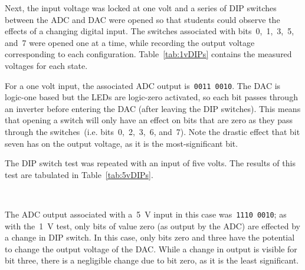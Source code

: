 Next, the input voltage was locked at one volt and a series of DIP switches between the ADC and DAC were opened so that students could observe the effects of a changing digital input.  The switches associated with bits~0,~1,~3,~5, and~7 were opened one at a time, while recording the output voltage corresponding to each configuration.  Table~\ref{tab:1vDIPs} contains the measured voltages for each state.
%
\begin{table}[H]
	\centering
	
	\parbox{.6\textwidth}{
	\caption[\SI{1}{\volt}DC DIP Switches]{Measured output for various DIP switch configurations with a~\SI{1}{\volt} input.}
	\label{tab:1vDIPs}}
\end{table}
%
For a one volt input, the associated ADC output is~\texttt{0011 0010}.  The DAC is logic-one based but the LEDs are logic-zero activated, so each bit passes through an inverter before entering the DAC (after leaving the DIP switches).  This means that opening a switch will only have an effect on bits that are zero as they pass through the switches~(i.e. bits~0,~2,~3,~6, and~7).  Note the drastic effect that bit seven has on the output voltage, as it is the most-significant bit.

The DIP switch test was repeated with an input of five volts.  The results of this test are tabulated in Table~\ref{tab:5vDIPs}.
%
\begin{table}[H]
	\centering
	\\
	\parbox{.6\textwidth}{
	\caption[\SI{5}{\volt}DC DIP Switches]{Output measured for several DIP switch states for a~\SI{5}{\volt} input to the ADC.}
	\label{tab:5vDIPs}}
\end{table}
%
The ADC output associated with a~\SI{5}{\volt} input in this case was~\texttt{1110 0010}; as with the~\SI{1}{\volt} test, only bits of value zero (as output by the ADC) are effected by a change in DIP switch.  In this case, only bits zero and three have the potential to change the output voltage of the DAC.  While a change in output is visible for bit three, there is a negligible change due to bit zero, as it is the least significant.

